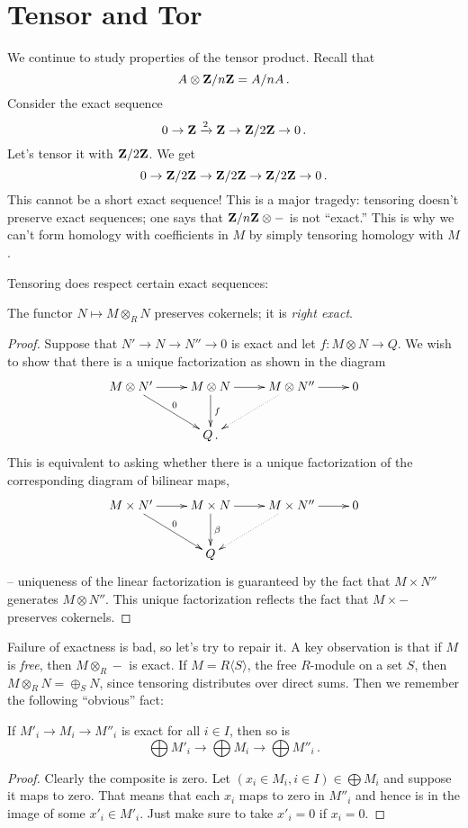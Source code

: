 \section{Tensor and Tor}

We continue to study properties of the tensor product. Recall that 
\[
A\otimes \mathbf Z/n\mathbf Z=A/nA\,.
\]
Consider the exact sequence 
\[
0\to \mathbf Z\xrightarrow{2}\mathbf Z\to \mathbf Z/2\mathbf Z\to 0\,.
\]
Let's tensor it with $\mathbf Z/2\mathbf Z$. We get
\[
0\to \mathbf Z/2\mathbf Z\to\mathbf Z/2\mathbf Z\to\mathbf Z/2\mathbf Z\to 0\,.
\]
This cannot be a short exact sequence! 
This is a major tragedy: tensoring doesn't preserve exact sequences; one says that $\mathbf Z/n\mathbf Z\otimes-$ is not ``exact.'' This is why we can't form homology with coefficients in $M$ by simply tensoring homology with $M$. 

Tensoring does respect certain exact sequences:
\begin{prop}
The functor $N\mapsto M\otimes_R N$ preserves cokernels; it is \emph{right exact}. 
\end{prop}
\begin{proof}
Suppose that $N'\to N\to N''\to0$ is exact and let $f:M\otimes N\to Q$.  
We wish to show that there is a unique factorization as shown in the diagram
\[
\xymatrix{ 
M\otimes N' \ar[r] \ar[dr]^0 & M\otimes N \ar[d]^f \ar[r] &
M\otimes N'' \ar[r] \ar@{.>}[dl] & 0 \\
& Q\,.
}\]
This is equivalent to asking whether there is a unique factorization
of the corresponding diagram of bilinear maps,
\[
\xymatrix{
M\times N' \ar[r] \ar[dr]^0 & M\times N \ar[d]^\beta \ar[r] &
M\times N'' \ar[r] \ar@{.>}[dl] & 0 \\
& Q 
}\]
-- uniqueness of the linear factorization is guaranteed by the fact that
$M\times N''$ generates $M\otimes N''$. This unique factorization reflects
the fact that $M\times-$ preserves cokernels. 
\end{proof}

Failure of exactness is bad, so let's try to repair it. A key observation is that if 
$M$ is {\em free}, then $M\otimes_R-$ is exact. If $M=R\langle S\rangle$, the
free $R$-module on a set $S$, then $M\otimes_RN=\oplus_SN$, since tensoring
distributes over direct sums. Then we remember the following ``obvious'' fact:
\begin{lemma}
If $M'_i\to M_i\to M''_i$ is exact for all $i\in I$, then so is 
\[
\bigoplus M'_i\to\bigoplus M_i\to\bigoplus M''_i\,.
\]
\end{lemma}
\begin{proof} Clearly the composite is zero. Let 
$(x_i\in M_i,i\in I)\in\bigoplus M_i$ and suppose it maps to zero. 
That means that each $x_i$ maps to zero in $M''_i$ and hence is in the
image of some $x'_i\in M'_i$. Just make sure to take $x'_i=0$ if $x_i=0$. 
\end{proof}

